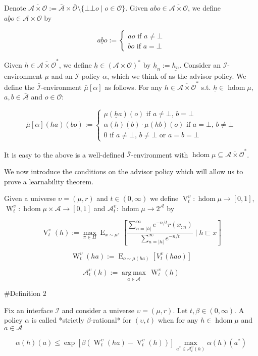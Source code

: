 \documentclass[a4paper]{article}
\DeclareMathOperator{\E}{E}
\newcommand{\Argmax}[1]{\underset{#1}{\operatorname{arg\,max}}\,}
\newcommand{\Abs}[1]{\lvert #1 \rvert}
\newcommand{\Ob}{\mathcal{O}}
\newcommand{\A}{\mathcal{A}}
\newcommand{\I}{\mathcal{I}}
\newcommand{\FH}{(\A \times \Ob)^*}
\newcommand{\Ado}{\bar{\Ob}}
\newcommand{\Ada}{\bar{\A}}
\newcommand{\Adi}{\bar{\I}}
\newcommand{\Adao}{\overline{\A \times \Ob}}
\newcommand{\Adfh}{\Adao^*}
\DeclareMathOperator{\HD}{hdom}
\newcommand{\V}{\operatorname{V}}
\newcommand{\W}{\operatorname{W}}
\begin{document}
Denote $\Adao:= \Ada \times \Ado \setminus \{\bot\bot o \mid o \in \Ob\}$. Given $abo \in \Adao$, we define $\underline{abo} \in \A \times \Ob$ by

$$\underline{abo}:=\begin{cases} ao \text{ if } a\ne\bot \\ bo \text{ if } a=\bot \end{cases}$$

Given $h \in \Adfh$, we define $\underline{h} \in \FH$ by $\underline{h}_n:=\underline{h_n}$. Consider an $\I$-environment $\mu$ and an $\I$-policy $\alpha$, which we think of as the advisor policy. We define the $\Adi$-environment $\bar{\mu}[\alpha]$ as follows. For any $h \in \Adfh$ s.t. $\underline{h} \in \HD \mu$, $a,b \in \Ada$ and $o \in \Ob$:

$$\bar{\mu}[\alpha](ha)(bo):=\begin{cases} \mu(\underline{h}a)(o) \text{ if } a\ne\bot,\, b=\bot \\ \alpha(\underline{h})(b)\cdot\mu(\underline{h}b)(o) \text{ if } a=\bot,\,b\ne\bot \\ 0 \text{ if } a\ne\bot,\, b\ne\bot \text{ or } a=b=\bot \end{cases}$$

It is easy to the above is a well-defined $\Adi$-environment with $\HD \mu \subseteq \Adfh$.

We now introduce the conditions on the advisor policy which will allow us to prove a learnability theorem.

Given a universe $\upsilon=(\mu,r)$ and $t \in (0, \infty)$ we define $\V_t^\upsilon: \HD{\mu} \rightarrow [0,1]$, $\W_t^\upsilon: \HD{\mu} \times \A \rightarrow [0,1]$ and $\A^\upsilon_t: \HD{\mu} \rightarrow 2^\A$ by

$$\V_t^\upsilon(h):=\max_{\pi \in \Pi} {\E_{x \sim \mu^\pi}[\frac{\sum_{n=\Abs{h}}^\infty e^{-n/t} r(x_{:n})}{\sum_{n=\Abs{h}}^\infty e^{-n/t}} \mid h \sqsubset x]}$$

$$\W_t^\upsilon(ha):=\E_{o \sim \mu(ha)}[V_t^\upsilon(hao)]$$

$$\A^\upsilon_t(h) := \Argmax{a \in \A} \W_t^\upsilon(h)$$

\#Definition 2

Fix an interface $\I$ and consider a universe $\upsilon=(\mu,r)$. Let $t,\beta \in (0,\infty)$. A policy $\alpha$ is called *strictly $\beta$-rational* for $(\upsilon,t)$ when for any $h \in \HD{\mu}$ and $a \in \A$

$$\alpha(h)(a) \leq \exp{[\beta(\W^\upsilon_t(ha)-\V^\upsilon_t(h))]} \max_{a^* \in \A^\upsilon_t(h)} \alpha(h)(a^*) $$
\end{document}
